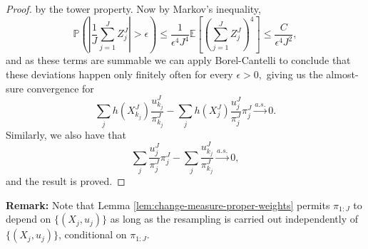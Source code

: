 \begin{proof}
    by the tower property. Now by Markov's inequality, 
    \begin{equation}\mathbb{P}\left(\left|\frac{1}{J} \sum_{j=1}^J Z_j^J\right|>\epsilon \right) 
    \leq \frac{1}{\epsilon^4J^4 } 
    \mathbb{E}\left[\left(\sum_{j=1}^J Z_j^J\right)^4\right] \leq \frac{C}{\epsilon^4J^2},\end{equation}
    and as these terms are summable we can apply Borel-Cantelli to conclude that these deviations happen only finitely often for every $\epsilon>0,$ giving us the almost-sure convergence for   
    \begin{equation} 
    \sum_j h(X_{k_j}^J)\frac{u_{k_j}^J}{\pi_{k_j}^J}
    -  \sum_j h(X_j^J)\frac{u_j^J}{\pi_j^J}\pi_j^J \stackrel{a.s.}{\to} 0.
    \end{equation} 
    Similarly, we also have that
    \begin{equation} 
    \sum_j \frac{u_j^J}{\pi_j^J}\pi_j^J
    - \sum_j \frac{u_{k_j}^J}{\pi_{k_j}^J} \stackrel{a.s.}{\to} 0,
    \end{equation}
    and the result is proved. 

    
    
\end{proof}


\noindent \textbf{Remark:} Note that Lemma \ref{lem:change-measure-proper-weights} permits $\pi_{1:J}$ to depend on $\{(X_j,u_j)\}$ as long as the resampling is carried out independently of $\{(X_j,u_j)\}$, conditional on $\pi_{1:J}$.

